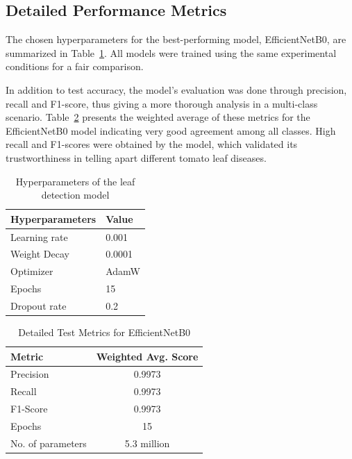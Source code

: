 \documentclass[pdflatex,sn-mathphys-num,iicol]{sn-jnl} %
\theoremstyle{thmstyleone}
\theoremstyle{thmstyletwo}
\theoremstyle{thmstylethree}
\begin{document}
\subsection{Detailed Performance Metrics}

The chosen hyperparameters for the best-performing model, EfficientNetB0, are summarized in Table~\ref{tab:hyperparameters}. All models were trained using the same experimental conditions for a fair comparison.

In addition to test accuracy, the model's evaluation was done through precision, recall and F1-score, thus giving a more thorough analysis in a multi-class scenario. Table~\ref{tab:test_metrics} presents the weighted average of these metrics for the EfficientNetB0 model indicating very good agreement among all classes. High recall and F1-scores were obtained by the model, which validated its trustworthiness in telling apart different tomato leaf diseases.



\begin{table}[htbp]
\centering
\small
\caption{Hyperparameters of the leaf detection model}
\label{tab:hyperparameters}
\begin{tabular}{p{} p{}} 
\toprule
\textbf{Hyperparameters} & \textbf{Value} \\
\midrule
Learning rate      & 0.001 \\
Weight Decay       & 0.0001 \\
Optimizer          & AdamW \\
Epochs             & 15 \\
Dropout rate       & 0.2 \\
\bottomrule
\end{tabular}
\end{table}

\begin{table}[htbp]
\centering
\small
\caption{Detailed Test Metrics for EfficientNetB0}
\label{tab:test_metrics}
\begin{tabular}{@{} l c @{}} 
\toprule
\textbf{Metric} & \textbf{Weighted Avg. Score} \\ 
\midrule
Precision          & 0.9973 \\
Recall             & 0.9973 \\
F1-Score           & 0.9973 \\
Epochs             & 15 \\
No. of parameters  & 5.3 million \\
\bottomrule
\end{tabular}
\end{table}
\end{document}
